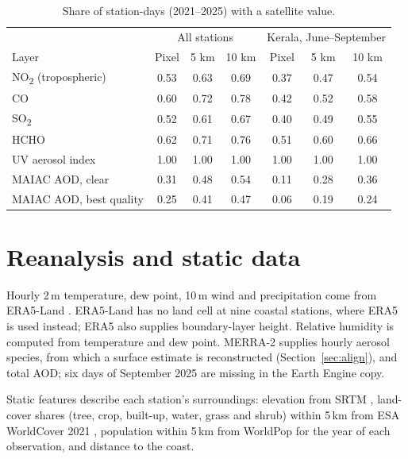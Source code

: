 \begin{table}[!htbp]
    \centering
    \small
    \begin{tabular}{l|c|c|c|c|c|c}
        \hline
        & \multicolumn{3}{c|}{All stations} & \multicolumn{3}{c}{Kerala, June--September} \\
        Layer & Pixel & 5 km & 10 km & Pixel & 5 km & 10 km \\
        \hline
        NO\textsubscript{2} (tropospheric) & 0.53 & 0.63 & 0.69 & 0.37 & 0.47 & 0.54 \\
        CO & 0.60 & 0.72 & 0.78 & 0.42 & 0.52 & 0.58 \\
        SO\textsubscript{2} & 0.52 & 0.61 & 0.67 & 0.40 & 0.49 & 0.55 \\
        HCHO & 0.62 & 0.71 & 0.76 & 0.51 & 0.60 & 0.66 \\
        UV aerosol index & 1.00 & 1.00 & 1.00 & 1.00 & 1.00 & 1.00 \\
        MAIAC AOD, clear & 0.31 & 0.48 & 0.54 & 0.11 & 0.28 & 0.36 \\
        MAIAC AOD, best quality & 0.25 & 0.41 & 0.47 & 0.06 & 0.19 & 0.24 \\
        \hline
    \end{tabular}
    \caption{Share of station-days (2021--2025) with a satellite value.}
    \label{tab:sat_avail}
\end{table}

\section{Reanalysis and static data}

Hourly 2\,m temperature, dew point, 10\,m wind and precipitation come from ERA5-Land
\cite{munozsabater2021era5land}. ERA5-Land has no land cell at nine coastal stations, where ERA5
\cite{hersbach2020era5} is used instead; ERA5 also supplies boundary-layer height. Relative humidity
is computed from temperature and dew point. MERRA-2 \cite{gelaro2017merra2} supplies hourly aerosol
species, from which a surface \pmtf{} estimate is reconstructed (Section~\ref{sec:align}), and total
AOD; six days of September 2025 are missing in the Earth Engine copy.

Static features describe each station's surroundings: elevation from SRTM \cite{farr2007srtm},
land-cover shares (tree, crop, built-up, water, grass and shrub) within 5\,km from ESA WorldCover
2021 \cite{zanaga2022worldcover}, population within 5\,km from WorldPop \cite{worldpop} for the
year of each observation, and distance to the coast.

